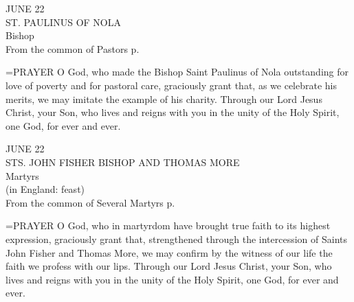 \begin{center}\normalsize JUNE 22\\
\footnotesize ST. PAULINUS OF NOLA\\
\footnotesize Bishop\\
\footnotesize From the common of Pastors p. \\
\end{center}

\hangindent=\parindent \small{PRAYER 
O God, who made the Bishop Saint Paulinus of Nola
outstanding for love of poverty and for pastoral care,
graciously grant that, as we celebrate his merits,
we may imitate the example of his charity.
Through our Lord Jesus Christ, your Son,
who lives and reigns with you in the unity of the Holy Spirit,
one God, for ever and ever.\\}
 
\begin{center}\normalsize JUNE 22\\
\footnotesize STS. JOHN FISHER  BISHOP AND THOMAS MORE\\
\footnotesize Martyrs\\
\footnotesize (in England: feast)\\
\footnotesize From the common of Several Martyrs p. \\
\end{center}

\hangindent=\parindent \small{PRAYER 
O God, who in martyrdom
have brought true faith to its highest expression,
graciously grant
that, strengthened through the intercession
of Saints John Fisher and Thomas More,
we may confirm by the witness of our life
the faith we profess with our lips.
Through our Lord Jesus Christ, your Son,
who lives and reigns with you in the unity of the Holy Spirit,
one God, for ever and ever.\\}
 
